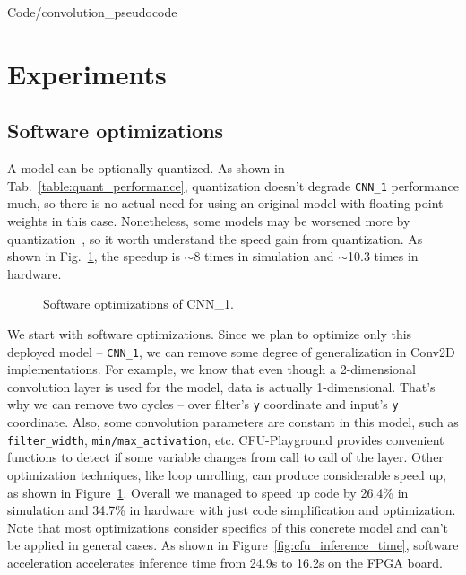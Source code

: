 \begin{minipage}{\textwidth}

    {
        Code/convolution_pseudocode
    }
\end{minipage}

\section{Experiments}

\subsection{Software optimizations} \label{software_optimization}

A model can be optionally quantized. As shown in Tab.~\ref{table:quant_performance}, quantization doesn't degrade \verb|CNN_1| performance much, so there is no actual need for using an original model with floating point weights in this case. Nonetheless, some models may be worsened more by quantization~\cite{quantization_survey}, so it worth understand the speed gain from quantization. As shown in Fig.~\ref{fig:software_optimization}, the speedup is $\sim$8 times in simulation and $\sim$10.3 times in hardware.

\begin{figure}
    \begin{center}
    \scalebox{0.8}{
        
    }
    \end{center}
    \caption{Software optimizations of CNN\_1.}
    \label{fig:software_optimization}
\end{figure}

We start with software optimizations. Since we plan to optimize only this deployed model -- \verb|CNN_1|, we can remove some degree of generalization in Conv2D implementations. For example, we know that even though a 2-dimensional convolution layer is used for the model, data is actually 1-dimensional. That's why we can remove two cycles -- over filter's \verb|y| coordinate and input's \verb|y| coordinate. Also, some convolution parameters are constant in this model, such as \verb|filter_width|, \verb|min/max_activation|, etc. CFU-Playground provides convenient functions to detect if some variable changes from call to call of the layer. Other optimization techniques, like loop unrolling, can produce considerable speed up, as shown in Figure~\ref{fig:software_optimization}. Overall we managed to speed up code by 26.4\% in simulation and 34.7\% in hardware with just code simplification and optimization. Note that most optimizations consider specifics of this concrete model and can't be applied in general cases. As shown in Figure~\ref{fig:cfu_inference_time}, software acceleration accelerates inference time from 24.9s to 16.2s on the FPGA board.

